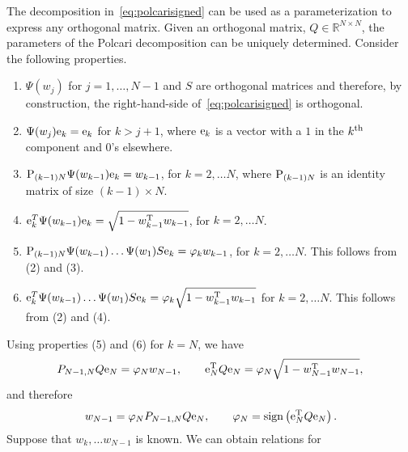 \documentclass[12pt]{article}
\begin{document}
The decomposition in~\eqref{eq:polcarisigned} can be used as a parameterization
to express any orthogonal matrix. Given an orthogonal matrix, $Q\in\mathbb{R}^{N\times N}$,
the parameters of the Polcari decomposition can be uniquely determined.
Consider the following properties.
\begin{enumerate}
\item $\Psi(w_j)$ for $j=1,\dots, N-1$ and $S$ are orthogonal matrices and therefore, by construction,
  the right-hand-side of~\eqref{eq:polcarisigned} is orthogonal. 
\item $\Psi(w_j) {\rm e}_k = {\rm e}_k$ for $k>j+1$,
  where ${\rm e}_k$ is a vector with a $1$ in the $k^{\rm th}$ component and $0$'s elsewhere.
\item ${\rm P}_{(k-1) N}\Psi(w_{k-1}) {\rm e}_{k} = w_{k-1}$, for $k=2,\dots N$,
  where ${\rm P}_{(k-1) N}$ is an identity matrix of size $(k-1) \times N$.
\item ${\rm e}_{k}^T\Psi(w_{k-1}) {\rm e}_{k} = \sqrt{1-w_{k-1}^{\rm T} w_{k-1}}$, for $k=2,\dots N$.
\item ${\rm P}_{(k-1)N} \Psi(w_{k-1}) \dots \Psi(w_1) S {\rm e}_k = \varphi_k w_{k-1}$,
  for $k=2,\dots N$. This follows from (2) and (3).
\item ${\rm e}_{k}^T \Psi(w_{k-1}) \dots \Psi(w_1) S {\rm e}_k = \varphi_k \sqrt{1 - w_{k-1}^{\rm T} w_{k-1}}$
  for $k=2,\dots N$. This follows from (2) and (4).
\end{enumerate}
%
Using properties (5) and (6) for $k=N$, we have
\begin{align*}
  P_{N-1,N}Q {\rm e}_N = \varphi_{N} w_{N-1}, \qquad {\rm e}_N^{\rm T} Q {\rm e}_N = \varphi_N \sqrt{1 - w_{N-1}^{\rm T} w_{N-1}},
\end{align*}
%
and therefore 
\begin{align*}
  w_{N-1} = \varphi_N P_{N-1,N}Q {\rm e}_N, \qquad \varphi_N = {\rm sign}\left({\rm e}_N^{\rm T} Q {\rm e}_N \right).
\end{align*}
%
Suppose that $w_{k}, \dots w_{N-1}$ is known. We can obtain relations for
\end{document}
